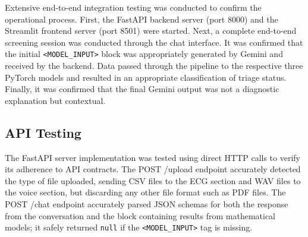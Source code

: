 Extensive end-to-end integration testing was conducted to confirm the operational process. First, the FastAPI backend server (port 8000) and the Streamlit frontend server (port 8501) were started. Next, a complete end-to-end screening session was conducted through the chat interface. It was confirmed that the initial \texttt{<MODEL\_INPUT>} block was appropriately generated by Gemini and received by the backend. Data passed through the pipeline to the respective three PyTorch models and resulted in an appropriate classification of triage status. Finally, it was confirmed that the final Gemini output was not a diagnostic explanation but contextual.

\begin{table}[h!]
\centering
\caption{Integration Test Results Summary}
\renewcommand{\arraystretch}{1.3}
\end{table}

\subsection{API Testing}

The FastAPI server implementation was tested using direct HTTP calls to verify its adherence to API contracts. The POST /upload endpoint accurately detected the type of file uploaded, sending CSV files to the ECG section and WAV files to the voice section, but discarding any other file format such as PDF files. The POST /chat endpoint accurately parsed JSON schemas for both the response from the conversation and the block containing results from mathematical models; it safely returned \texttt{null} if the \texttt{<MODEL\_INPUT>} tag is missing.
